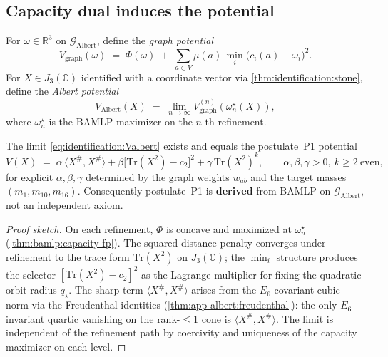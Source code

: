 \subsection{Capacity dual induces the potential}
\label{sec:identification:potential}

\begin{definition}\label{def:identification:Vgraph}
For $\omega\in\mathbb{R}^3$ on $\mathcal{G}_{\mathrm{Albert}}$, define the
\emph{graph potential}
\begin{equation}
  V_{\mathrm{graph}}(\omega)\;=\;\Phi(\omega)\;+\;\sum_{a\in V}\mu(a)\,
  \min_i\bigl(c_i(a)-\omega_i\bigr)^2.
\end{equation}
For $X\in J_3(\mathbb{O})$ identified with a coordinate vector via
\autoref{thm:identification:stone}, define the \emph{Albert potential}
\begin{equation}
  V_{\mathrm{Albert}}(X)\;=\;\lim_{n\to\infty}V_{\mathrm{graph}}^{(n)}
  (\omega^\star_n(X)),
  \label{eq:identification:Valbert}
\end{equation}
where $\omega^\star_n$ is the BAMLP maximizer on the $n$-th refinement.
\end{definition}

\begin{theorem}\label{thm:identification:potential}
The limit \eqref{eq:identification:Valbert} exists and equals the postulate~\textnormal{P1}
potential
\begin{equation}
  V(X)\;=\;\alpha\,\langle X^{\#},X^{\#}\rangle
  +\beta\bigl[\mathrm{Tr}(X^2)-c_2\bigr]^2
  +\gamma\,\mathrm{Tr}(X^2)^k,
  \qquad \alpha,\beta,\gamma>0,\ k\ge2\ \text{even},
\end{equation}
for explicit $\alpha,\beta,\gamma$ determined by the graph weights $w_{ab}$ and
the target masses $(m_1,m_{10},m_{16})$. Consequently postulate~\textnormal{P1}
is \textbf{derived} from BAMLP on $\mathcal{G}_{\mathrm{Albert}}$, not an
independent axiom.
\end{theorem}

\begin{proof}[Proof sketch]
On each refinement, $\Phi$ is concave and maximized at $\omega^\star_n$
(\autoref{thm:bamlp:capacity-fp}). The squared-distance penalty converges under
refinement to the trace form $\mathrm{Tr}(X^2)$ on $J_3(\mathbb{O})$; the
$\min_i$ structure produces the selector $[\mathrm{Tr}(X^2)-c_2]^2$ as the
Lagrange multiplier for fixing the quadratic orbit radius $q_\star$.
The sharp term $\langle X^{\#},X^{\#}\rangle$ arises from the
$E_6$-covariant cubic norm via the Freudenthal identities
(\autoref{thm:app-albert:freudenthal}): the only $E_6$-invariant quartic
vanishing on the rank-$\le1$ cone is $\langle X^{\#},X^{\#}\rangle$. The limit
is independent of the refinement path by coercivity and uniqueness of the
capacity maximizer on each level.
\end{proof}

